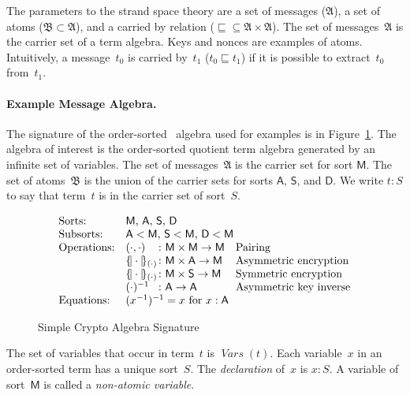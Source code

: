 \documentclass[12pt]{article}
\newcommand{\fn}[1]{\ensuremath{\operatorname{\mathit{#1}}}}
\newcommand{\srt}[1]{\ensuremath{\mathsf{#1}}}
\newcommand{\typ}{\mathbin:}
\newcommand{\vars}{\fn{Vars}}
\newcommand{\enc}[2]{\ensuremath{\{\!|#1|\!\}_{#2}}}
\newcommand{\alg}[1]{\ensuremath{\mathfrak{#1}}}
\newcommand{\msg}{\alg{A}}
\newcommand{\atm}{\alg{B}}
\begin{document}
The parameters to the strand space theory are a set of messages
(\msg), a set of atoms ($\atm\subset\msg$), and a carried by relation
(${\sqsubseteq}\subseteq\msg\times\msg$).  The set of messages~{\msg}
is the carrier set of a term algebra.  Keys and nonces are examples of
atoms.  Intuitively, a message~$t_0$ is carried by~$t_1$
($t_0\sqsubseteq t_1$) if it is possible to extract~$t_0$ from~$t_1$.

\paragraph{Example Message Algebra.}

The signature of the order-sorted~\cite{GoguenMeseguer92} algebra used
for examples is in Figure~\ref{fig:signature}.  The algebra of
interest is the order-sorted quotient term algebra generated by an
infinite set of variables.  The set of messages~{\msg} is the carrier
set for sort \srt{M}.  The set of atoms~{\atm} is the union of the
carrier sets for sorts \srt{A}, \srt{S}, and \srt{D}.  We write $t\typ
S$ to say that term~$t$ is in the carrier set of sort~$S$.

\begin{figure}
$$\begin{array}{ll@{{}\colon{}}ll}
\mbox{Sorts:}&
\multicolumn{3}{l}{\mbox{\srt{M}, \srt{A}, \srt{S}, \srt{D}}}\\
\mbox{Subsorts:}&
\multicolumn{3}{l}{\mbox{$\srt{A}<\srt{M}$, $\srt{S}<\srt{M}$,
    $\srt{D}<\srt{M}$}}\\
\mbox{Operations:}&(\cdot,\cdot)&\srt{M}\times\srt{M}\to\srt{M}
&\mbox{Pairing}\\
&\enc{\cdot}{(\cdot)}&\srt{M}\times\srt{A}\to\srt{M}
&\mbox{Asymmetric encryption}\\
&\enc{\cdot}{(\cdot)}&\srt{M}\times\srt{S}\to\srt{M}
&\mbox{Symmetric encryption}\\
&(\cdot)^{-1}&\srt{A}\to\srt{A}
&\mbox{Asymmetric key inverse}\\
\mbox{Equations:}&\multicolumn{3}{l}{(x^{-1})^{-1}=x\mbox{ for $x:\srt{A}$}}
\end{array}$$
\caption{Simple Crypto Algebra Signature}\label{fig:signature}
\end{figure}

The set of variables that occur in term~$t$ is $\vars(t)$.  Each
variable~$x$ in an order-sorted term has a unique sort~$S$.  The
\emph{declaration} of~$x$ is $x\typ S$.  A variable of sort~\srt{M} is
called a \emph{non-atomic variable}.
\end{document}

